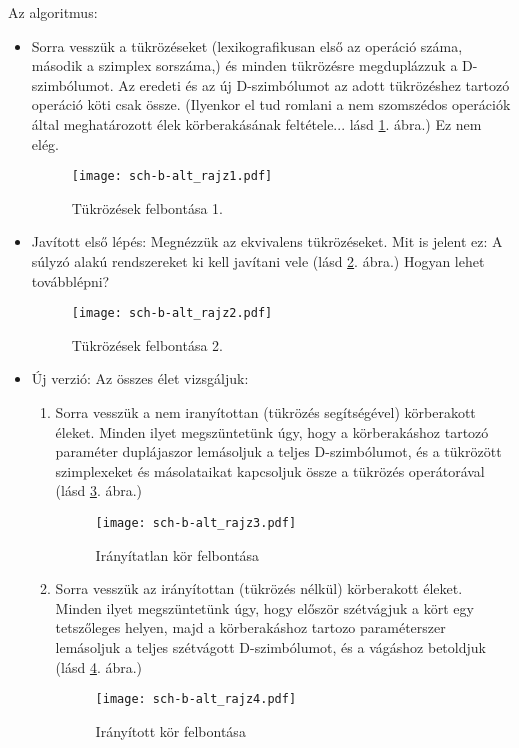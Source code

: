 \documentclass[12pt,magyar,a4paper]{article}
\begin{document}
Az algoritmus:
\begin{itemize}
  \item Sorra vesszük a tükrözéseket (lexikografikusan első az operáció száma,
    második a szimplex sorszáma,) és minden tükrözésre megduplázzuk a
    D-szimbólumot. Az eredeti és az új D-szimbólumot az adott tükrözéshez
    tartozó operáció köti csak össze. (Ilyenkor el tud romlani a nem szomszédos
    operációk által meghatározott élek körberakásának feltétele... lásd
    \ref{schrajz1}. ábra.) Ez nem elég.
    \begin{figure}
      \caption{\label{schrajz1} Tükrözések felbontása 1.}
      \center
      \texttt{[image: sch-b-alt\_rajz1.pdf]}
    \end{figure}
  \item Javított első lépés: Megnézzük az ekvivalens tükrözéseket. Mit is jelent
    ez: A súlyzó alakú rendszereket ki kell javítani vele (lásd \ref{schrajz2}.
    ábra.) Hogyan lehet továbblépni?
    \begin{figure}
      \caption{\label{schrajz2} Tükrözések felbontása 2.}
      \center
      \texttt{[image: sch-b-alt\_rajz2.pdf]}
    \end{figure}
  \item Új verzió: Az összes élet vizsgáljuk:
    \begin{enumerate}
      \item Sorra vesszük a nem iranyítottan (tükrözés segítségével) körberakott
	éleket. Minden ilyet megszüntetünk úgy, hogy a körberakáshoz tartozó
	paraméter duplájaszor lemásoljuk a teljes D-szimbólumot, és a
	tükrözött szimplexeket és másolataikat kapcsoljuk össze a tükrözés
	operátorával (lásd \ref{schrajz3}. ábra.)
	\begin{figure}
	  \caption{\label{schrajz3} Irányítatlan kör felbontása}
	  \center
	  \texttt{[image: sch-b-alt\_rajz3.pdf]}
	\end{figure}
      \item Sorra vesszük az irányítottan (tükrözés nélkül) körberakott éleket.
	Minden ilyet megszüntetünk úgy, hogy először szétvágjuk a kört egy
	tetszőleges helyen, majd a körberakáshoz tartozo paraméterszer
	lemásoljuk a teljes szétvágott D-szimbólumot, és a vágáshoz betoldjuk
	(lásd \ref{schrajz4}. ábra.)
	\begin{figure}
	  \caption{\label{schrajz4} Irányított kör felbontása}
	  \center
	  \texttt{[image: sch-b-alt\_rajz4.pdf]}
	\end{figure}
    \end{enumerate}
\end{itemize}
\end{document}
